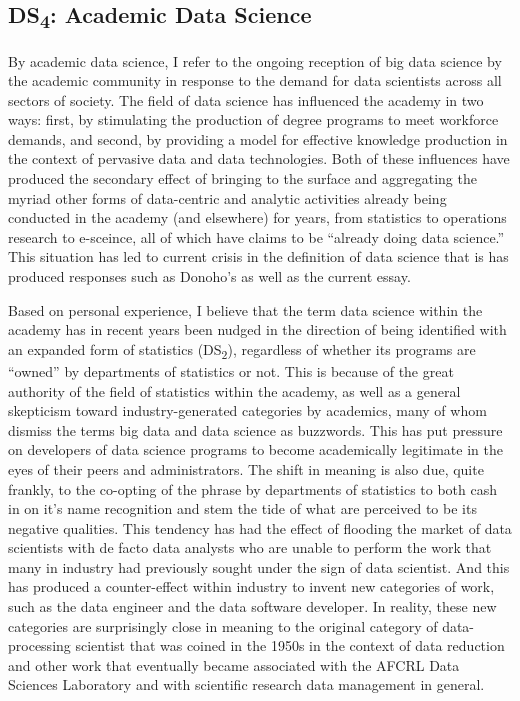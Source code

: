 \documentclass[
  letterpaper,
]{report}
\begin{document}
\hypertarget{ds4-academic-data-science}{%
\subsection{\texorpdfstring{DS\textsubscript{4}: Academic Data
Science}{DS4: Academic Data Science}}\label{ds4-academic-data-science}}

By academic data science, I refer to the ongoing reception of big data
science by the academic community in response to the demand for data
scientists across all sectors of society. The field of data science has
influenced the academy in two ways: first, by stimulating the production
of degree programs to meet workforce demands, and second, by providing a
model for effective knowledge production in the context of pervasive
data and data technologies. Both of these influences have produced the
secondary effect of bringing to the surface and aggregating the myriad
other forms of data-centric and analytic activities already being
conducted in the academy (and elsewhere) for years, from statistics to
operations research to e-sceince, all of which have claims to be
``already doing data science.'' This situation has led to current crisis
in the definition of data science that is has produced responses such as
Donoho's as well as the current essay.

Based on personal experience, I believe that the term data science
within the academy has in recent years been nudged in the direction of
being identified with an expanded form of statistics
(DS\textsubscript{2}), regardless of whether its programs are ``owned''
by departments of statistics or not. This is because of the great
authority of the field of statistics within the academy, as well as a
general skepticism toward industry-generated categories by academics,
many of whom dismiss the terms big data and data science as buzzwords.
This has put pressure on developers of data science programs to become
academically legitimate in the eyes of their peers and administrators.
The shift in meaning is also due, quite frankly, to the co-opting of the
phrase by departments of statistics to both cash in on it's name
recognition and stem the tide of what are perceived to be its negative
qualities. This tendency has had the effect of flooding the market of
data scientists with de facto data analysts who are unable to perform
the work that many in industry had previously sought under the sign of
data scientist. And this has produced a counter-effect within industry
to invent new categories of work, such as the data engineer and the data
software developer. In reality, these new categories are surprisingly
close in meaning to the original category of data-processing scientist
that was coined in the 1950s in the context of data reduction and other
work that eventually became associated with the AFCRL Data Sciences
Laboratory and with scientific research data management in general.
\end{document}
